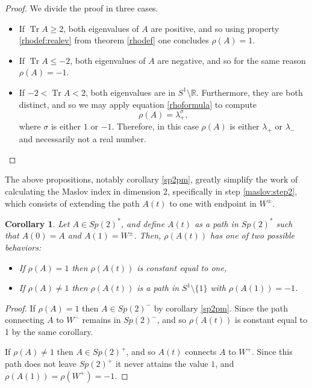\documentclass{article}
\newtheorem{corollary}{Corollary}
\theoremstyle{nonumberplain}
\newtheorem{proof}{Proof}
\newcommand{\R}{\mathbb{R}}
\DeclareMathOperator{\trace}{Tr}
\begin{document}
\begin{proof}
We divide the proof in three cases.
\begin{itemize}
\item If $\trace A \geq 2$, both eigenvalues of $A$ are positive, and so using property \ref{rhodef:realev} from theorem \ref{rhodef} one concludes $\rho(A) = 1$.
\item If $\trace A \leq -2$, both eigenvalues of $A$ are negative, and so for the same reason $\rho(A) = -1$.
\item If $-2 < \trace A < 2$, both eigenvalues are in $S^1 \setminus \R$. Furthermore, they are both distinct, and so we may apply equation \eqref{rhoformula} to compute
\begin{equation}\label{sp2pm:3}
\rho(A) = \lambda_+^\sigma,
\end{equation}
where $\sigma$ is either $1$ or $-1$. Therefore, in this case $\rho(A)$ is either $\lambda_+$ or $\lambda_-$ and necessarily not a real number.
\end{itemize}
\end{proof}

The above propositions, notably corollary \ref{sp2pm}, greatly simplify the work of calculating the Maslov index in dimension 2, specifically in step \ref{maslov:step2}, which consists of extending the path $A(t)$ to one with endpoint in $W^\pm$.

\begin{corollary}\label{sp2rhoextension}
Let $A \in Sp(2)^*$, and define $A(t)$ as a path in $Sp(2)^*$ such that $A(0) = A$ and $A(1) = W^\pm$. Then, $\rho(A(t))$ has one of two possible behaviors:
\begin{itemize}
\item If $\rho(A) = 1$ then $\rho(A(t))$ is constant equal to one,
\item If $\rho(A) \neq 1$ then $\rho(A(t))$ is a path in $S^1 \setminus \{1\}$ with $\rho(A(1)) = -1$.
\end{itemize}
\end{corollary}

\begin{proof}
If $\rho(A) = 1$ then $A \in Sp(2)^-$ by corollary \ref{sp2pm}. Since the path connecting $A$ to $W^-$ remains in $Sp(2)^-$, and so $\rho(A(t))$ is constant equal to 1 by the same corollary.

If $\rho(A) \neq 1$ then $A \in Sp(2)^+$, and so $A(t)$ connects $A$ to $W^+$. Since this path does not leave $Sp(2)^+$ it never attains the value $1$, and $\rho(A(1)) = \rho(W^+) = -1$.
\end{proof}
\end{document}
